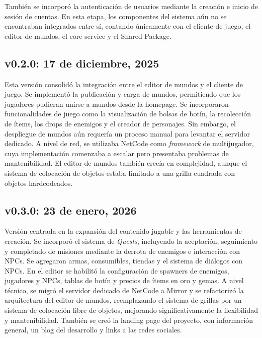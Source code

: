 \vspace{0.25cm}

También se incorporó la autenticación de usuarios mediante la creación e inicio de sesión de cuentas. 
En esta etapa, los componentes del sistema aún no se encontraban integrados entre sí, contando únicamente 
con el cliente de juego, el editor de mundos, el core-service y el Shared Package.

\subsection{v0.2.0: 17 de diciembre, 2025}

Esta versión consolidó la integración entre el editor de mundos y el cliente de juego. Se implementó 
la publicación y carga de mundos, permitiendo que los jugadores pudieran unirse a mundos desde la 
homepage. Se incorporaron funcionalidades de juego como la visualización de bolsas de botín, la 
recolección de ítems, los drops de enemigos y el creador de personajes. Sin embargo, el despliegue 
de mundos aún requería un proceso manual para levantar el servidor dedicado. A nivel de red, se 
utilizaba NetCode como \textit{framework} de multijugador, cuya implementación comenzaba a escalar pero 
presentaba problemas de mantenibilidad. El editor de mundos también crecía en complejidad, aunque 
el sistema de colocación de objetos estaba limitado a una grilla cuadrada con objetos hardcodeados.

\subsection{v0.3.0: 23 de enero, 2026}

Versión centrada en la expansión del contenido jugable y las herramientas de creación. Se incorporó 
el sistema de \textit{Quests}, incluyendo la aceptación, seguimiento y completado de misiones mediante 
la derrota de enemigos e interacción con NPCs. Se agregaron armas, consumibles, tiendas y el sistema 
de diálogos con NPCs. En el editor se habilitó la configuración de spawners de enemigos, jugadores y 
NPCs, tablas de botín y precios de ítems en oro y gemas. A nivel técnico, se migró el servidor dedicado 
de NetCode a Mirror y se refactorizó la arquitectura del editor de mundos, reemplazando el sistema de 
grillas por un sistema de colocación libre de objetos, mejorando significativamente la flexibilidad 
y mantenibilidad. También se creó la landing page del proyecto, con información general,
un blog del desarrollo y links a las redes sociales.

